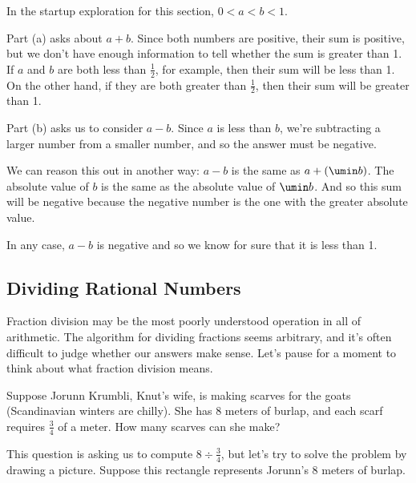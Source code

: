\begin{boxedex}
In the startup exploration for this section, $0 < a < b < 1$.

Part (a) asks about $a + b$. Since both numbers are positive, their sum is positive, but we don't have enough information to tell whether the sum is greater than 1. If $a$ and $b$ are both less than $\frac{1}{2}$, for example, then their sum will be less than 1. On the other hand, if they are both greater than $\frac{1}{2}$, then their sum will be greater than 1.

Part (b) asks us to consider $a - b$. Since $a$ is less than $b$, we're subtracting a larger number from a smaller number, and so the answer must be negative.

We can reason this out in another way: $a-b$ is the same as $a + (\umin b)$. The absolute value of $b$ is the same as the absolute value of $\umin b$. And so this sum will be negative because the negative number is the one with the greater absolute value.

In any case, $a-b$ is negative and so we know for sure that it is less than 1.
\end{boxedex}

\subsection{Dividing Rational Numbers}

Fraction division may be the most poorly understood operation in all of arithmetic. The algorithm for dividing fractions seems arbitrary, and it's often difficult to judge whether our answers make sense. Let's pause for a moment to think about what fraction division means.

Suppose Jorunn Krumbli, Knut's wife, is making scarves for the goats (Scandinavian winters are chilly). She has 8 meters of burlap, and each scarf requires $\frac{3}{4}$ of a meter. How many scarves can she make?

This question is asking us to compute $8 \div \frac{3}{4}$, but let's try to solve the problem by drawing a picture. Suppose this rectangle represents Jorunn's 8 meters of burlap.
\begin{center}
\end{center}

